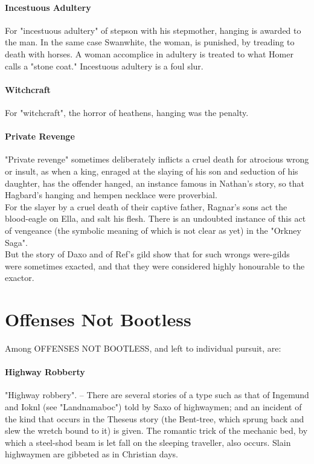 \documentclass[10pt,a4paper]{report}
\begin{document}
\paragraph*{Incestuous Adultery}
For "incestuous adultery" of stepson with his stepmother, hanging is awarded to the man. In the same case Swanwhite, the woman, is punished, by treading to death with horses. A woman accomplice in adultery is treated to what Homer calls a "stone coat." Incestuous adultery is a foul slur.\\

\paragraph*{Witchcraft}
For "witchcraft", the horror of heathens, hanging was the penalty.\\

\paragraph*{Private Revenge}
"Private revenge" sometimes deliberately inflicts a cruel death for atrocious wrong or insult, as when a king, enraged at the slaying of his son and seduction of his daughter, has the offender hanged, an instance famous in Nathan's story, so that Hagbard's hanging and hempen necklace were proverbial.\\

For the slayer by a cruel death of their captive father, Ragnar's sons act the blood-eagle on Ella, and salt his flesh. There is an undoubted instance of this act of vengeance (the symbolic meaning of which is not clear as yet) in the "Orkney Saga".\\

But the story of Daxo and of Ref's gild show that for such wrongs were-gilds were sometimes exacted, and that they were considered highly honourable to the exactor.\\

\section{Offenses Not Bootless}
Among OFFENSES NOT BOOTLESS, and left to individual pursuit, are:\\

\paragraph*{Highway Robberty}
"Highway robbery". -- There are several stories of a type such as that of Ingemund and Ioknl (see "Landnamaboc") told by Saxo of highwaymen; and an incident of the kind that occurs in the Theseus story (the Bent-tree, which sprung back and slew the wretch bound to it) is given. The romantic trick of the mechanic bed, by which a steel-shod beam is let fall on the sleeping traveller, also occurs. Slain highwaymen are gibbeted as in Christian days.\\
\end{document}
